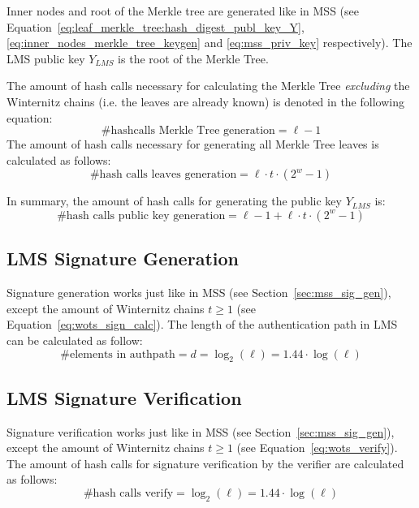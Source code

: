 Inner nodes and root of the Merkle tree are generated like in MSS (see Equation~\ref{eq:leaf_merkle_tree:hash_digest_publ_key_Y}, \ref{eq:inner_nodes_merkle_tree_keygen} and \ref{eq:mss_priv_key} respectively). The LMS public key $Y_{LMS}$ is the root of the Merkle Tree.

The amount of hash calls necessary for calculating the Merkle Tree \textit{excluding} the Winternitz chains (i.e. the leaves are already known) is denoted in the following equation:
\begin{equation}
\label{eq:lms_hashcalls_tree_treegen}
\text{\# hashcalls Merkle Tree generation} = \ell - 1
\end{equation}
The amount of hash calls necessary for generating all Merkle Tree leaves is calculated as follows:
\begin{equation}
\text{\# hash calls leaves generation} = \ell \cdot t \cdot (2^w-1)
\end{equation}

In summary, the amount of hash calls for generating the public key $Y_{LMS}$ is:
\begin{equation}
\text{\# hash calls public key generation} = \ell - 1 + \ell \cdot t \cdot (2^w-1)
\end{equation}

\subsection{LMS Signature Generation}
Signature generation works just like in MSS (see Section~\ref{sec:mss_sig_gen}), except the amount of Winternitz chains $t \geq 1$ (see Equation~\ref{eq:wots_sign_calc}).
The length of the authentication path in LMS can be calculated as follow:
\begin{equation}
\label{eq:lms_authpath_el}
\text{\# elements in authpath} = d = \log_2(\ell) = 1.44 \cdot \log(\ell)
\end{equation}

\subsection{LMS Signature Verification}
Signature verification works just like in MSS (see Section~\ref{sec:mss_sig_gen}), except the amount of Winternitz chains $t \geq 1$ (see Equation~\ref{eq:wots_verify}).
The amount of hash calls for signature verification by the verifier are calculated as follows:
\begin{equation}
\label{eq:lms_hashcalls_verify}
\text{\# hash calls verify} = \log_2(\ell) = 1.44 \cdot \log(\ell)  
\end{equation}

